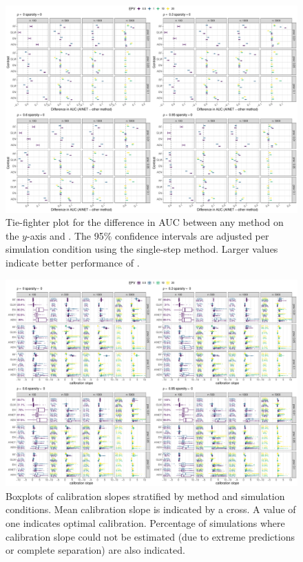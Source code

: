 \begin{subappendices}
\begin{landscape}
\begin{figure}[!ht]
\center
\includegraphics[width=0.9\linewidth]{images/paper6/figureS4.pdf}
\caption{Tie-fighter plot for the difference in AUC between any method on
  the $y$-axis and \ainet{}. The 95\% confidence intervals are adjusted per
  simulation condition using the single-step method. Larger values indicate
  better performance of \ainet{}. } \label{fig6:tieAUC}
\end{figure}
\end{landscape}

\begin{landscape}
\begin{figure}[!ht]
\center
\includegraphics[width=0.9\linewidth]{images/paper6/figureS5.pdf}
\caption{Boxplots of calibration slopes stratified by method and simulation
  conditions. Mean calibration slope is indicated by a cross. A value of one
  indicates optimal calibration. Percentage of simulations where calibration
  slope could not be estimated (due to extreme predictions or complete
  separation) are also indicated.} \label{fig6:cslope}
\end{figure}
\end{landscape}


\end{subappendices}
